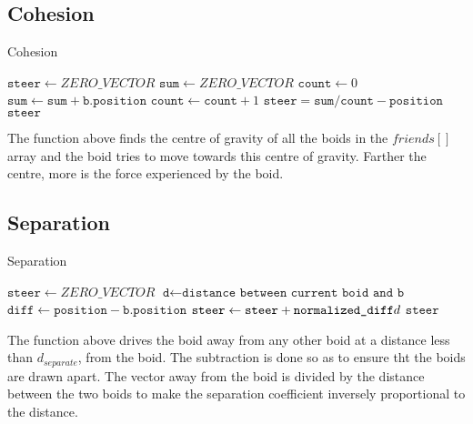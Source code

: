 \documentclass[12pt]{report}
\newcommand{\vars}{\texttt}
\let\oldReturn\Return
\renewcommand{\Return}{\State\oldReturn}
\begin{document}
\subsection*{Cohesion}
\begin{algorithm}
\caption{Cohesion}\label{cohesion}
\begin{algorithmic}[1]
	\State $\vars{steer} \gets ZERO\_VECTOR$
	\State $\vars{sum} \gets ZERO\_VECTOR$
	\State $\vars{count} \gets 0$
        \State $\vars{sum} \gets \vars{sum} + \vars{b.position} $
        \State $\vars{count} \gets \vars{count} + 1 $ 
	\EndFor
    \If{$\vars{count} > 0$}
        \State $\vars{steer} = \vars{sum}/\vars{count}- \vars{position}$
    \EndIf
    \Return $\vars{steer}$
\EndFunction
\end{algorithmic}
\end{algorithm}
The function above finds the centre of gravity of all the boids in the \(friends[]\) array and the boid tries to move towards this centre of gravity. Farther the centre, more is the force experienced by the boid. 

\subsection*{Separation}
\begin{algorithm}
\caption{Separation}\label{separation}
\begin{algorithmic}[1]
	\State $\vars{steer} \gets ZERO\_VECTOR$
    	\State $\vars{d} \gets \texttt{distance between current boid and b}$
		\If{$\vars{d} > 0$ AND $\vars{d} < d_{separate}$}
        \State $\vars{diff} \gets \vars{position}-\vars{b.position}$
        \State $\vars{steer} \gets \vars{steer}+\vars{normalized\_diff}\/d $
        \EndIf
	\EndFor
    \Return $\vars{steer}$
\EndFunction
\end{algorithmic}
\end{algorithm}
The function above drives the boid away from any other boid at a distance less than $ d_{separate} $, from the boid. The subtraction is done so as to ensure tht  the boids are drawn apart. The vector away from the boid is divided by the distance between the two boids to make the separation coefficient inversely proportional to the distance.
\end{document}
